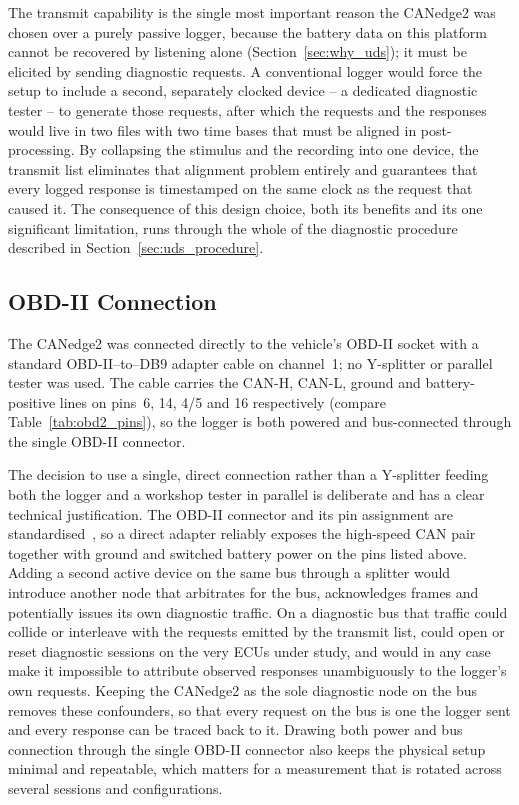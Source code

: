 \documentclass[11pt,a4paper,oneside,parskip=half]{scrreprt}
\begin{document}
The transmit capability is the single most important reason the CANedge2 was chosen over a purely passive logger, because the battery data on this platform cannot be recovered by listening alone (Section~\ref{sec:why_uds}); it must be elicited by sending diagnostic requests. A conventional logger would force the setup to include a second, separately clocked device -- a dedicated diagnostic tester -- to generate those requests, after which the requests and the responses would live in two files with two time bases that must be aligned in post-processing. By collapsing the stimulus and the recording into one device, the transmit list eliminates that alignment problem entirely and guarantees that every logged response is timestamped on the same clock as the request that caused it. The consequence of this design choice, both its benefits and its one significant limitation, runs through the whole of the diagnostic procedure described in Section~\ref{sec:uds_procedure}.

\subsection{OBD-II Connection}
The CANedge2 was connected directly to the vehicle's OBD-II socket with a standard OBD-II--to--DB9 adapter cable on channel~1; no Y-splitter or parallel tester was used. The cable carries the CAN-H, CAN-L, ground and battery-positive lines on pins~6, 14, 4/5 and 16 respectively (compare Table~\ref{tab:obd2_pins}), so the logger is both powered and bus-connected through the single OBD-II connector.

The decision to use a single, direct connection rather than a Y-splitter feeding both the logger and a workshop tester in parallel is deliberate and has a clear technical justification. The OBD-II connector and its pin assignment are standardised~\cite{saej1962}, so a direct adapter reliably exposes the high-speed CAN pair together with ground and switched battery power on the pins listed above. Adding a second active device on the same bus through a splitter would introduce another node that arbitrates for the bus, acknowledges frames and potentially issues its own diagnostic traffic. On a diagnostic bus that traffic could collide or interleave with the requests emitted by the transmit list, could open or reset diagnostic sessions on the very ECUs under study, and would in any case make it impossible to attribute observed responses unambiguously to the logger's own requests. Keeping the CANedge2 as the sole diagnostic node on the bus removes these confounders, so that every request on the bus is one the logger sent and every response can be traced back to it. Drawing both power and bus connection through the single OBD-II connector also keeps the physical setup minimal and repeatable, which matters for a measurement that is rotated across several sessions and configurations.
\end{document}
